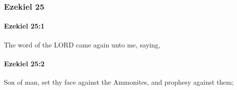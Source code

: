 	\subsubsection{Ezekiel 25} %
		\label{EZEKIEL-25}

		\paragraph{Ezekiel 25:1} %
			\label{EZEKIEL-25-1}

			The word of the LORD came again unto me, saying,


		\paragraph{Ezekiel 25:2} %
			\label{EZEKIEL-25-2}

			Son of man, set thy face against the Ammonites, and prophesy against them;

